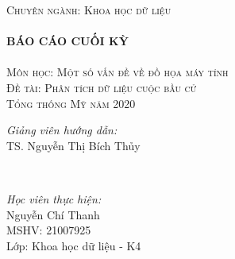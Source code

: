 \documentclass[14pt, a4paper]{article}
\numberwithin{equation}{section}
\numberwithin{figure}{section}
\numberwithin{dl}{section}
\numberwithin{md}{section}
\numberwithin{bd}{section}
\numberwithin{dn}{section}
\numberwithin{hq}{section}
\begin{document}
\begin{titlepage}
        \textsc{\Large Chuyên ngành: Khoa học dữ liệu}\\[0.5cm] %



        \HRule \\[0.4cm]
        { \huge \bfseries BÁO CÁO CUỐI KỲ}\\[0.4cm] %
        \HRule \\[1.5cm]

        \textsc{\Large Môn học: Một số vấn đề về đồ họa máy tính}\\[1cm] %


        \textsc{\Large Đề tài: Phân tích dữ liệu cuộc bầu cử \\ Tổng thống Mỹ năm 2020}\\[2cm]


        \begin{minipage}{0.4\textwidth}
            \begin{flushleft} \large
            \emph{Giảng viên hướng dẫn:} \\
            TS. Nguyễn Thị Bích Thủy %
            \end{flushleft}
        \end{minipage}\\[0.5cm]

        \begin{minipage}{0.4\textwidth}
        \begin{flushleft} \large
        \emph{Học viên thực hiện:}\\
        Nguyễn Chí Thanh \\
        MSHV: 21007925 \\ %
        Lớp: Khoa học dữ liệu - K4
        \end{flushleft}
        \end{minipage}




\end{titlepage}
\end{document}
